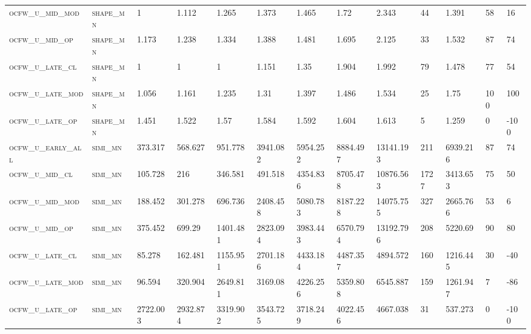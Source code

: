\begin{landscape}
\begin{center}
\begin{footnotesize}
\begin{longtable}{lllllllllllll}
\textsc{ocfw\_u\_mid\_mod  } & \textsc{shape\_mn }   & 1        & 1.112    & 1.265    & 1.373    & 1.465    & 1.72     & 2.343     & 44     & 1.391         & 58            & 16       \\
\textsc{ocfw\_u\_mid\_op   } & \textsc{shape\_mn }   & 1.173    & 1.238    & 1.334    & 1.388    & 1.481    & 1.695    & 2.125     & 33     & 1.532         & 87            & 74       \\
\textsc{ocfw\_u\_late\_cl  } & \textsc{shape\_mn }   & 1        & 1        & 1        & 1.151    & 1.35     & 1.904    & 1.992     & 79     & 1.478         & 77            & 54       \\
\textsc{ocfw\_u\_late\_mod } & \textsc{shape\_mn }   & 1.056    & 1.161    & 1.235    & 1.31     & 1.397    & 1.486    & 1.534     & 25     & 1.75          & 100           & 100      \\
\textsc{ocfw\_u\_late\_op  } & \textsc{shape\_mn }   & 1.451    & 1.522    & 1.57     & 1.584    & 1.592    & 1.604    & 1.613     & 5      & 1.259         & 0             & -100     \\
\textsc{ocfw\_u\_early\_all} & \textsc{simi\_mn  }   & 373.317  & 568.627  & 951.778  & 3941.082 & 5954.252 & 8884.497 & 13141.193 & 211    & 6939.216      & 87            & 74       \\
\textsc{ocfw\_u\_mid\_cl   } & \textsc{simi\_mn  }   & 105.728  & 216      & 346.581  & 491.518  & 4354.836 & 8705.478 & 10876.563 & 1727   & 3413.653      & 75            & 50       \\
\textsc{ocfw\_u\_mid\_mod  } & \textsc{simi\_mn  }   & 188.452  & 301.278  & 696.736  & 2408.458 & 5080.783 & 8187.228 & 14075.755 & 327    & 2665.766      & 53            & 6        \\
\textsc{ocfw\_u\_mid\_op   } & \textsc{simi\_mn  }   & 375.452  & 699.29   & 1401.481 & 2823.094 & 3983.443 & 6570.794 & 13192.796 & 208    & 5220.69       & 90            & 80       \\
\textsc{ocfw\_u\_late\_cl  } & \textsc{simi\_mn  }   & 85.278   & 162.481  & 1155.951 & 2701.186 & 4433.184 & 4487.357 & 4894.572  & 160    & 1216.445      & 30            & -40      \\
\textsc{ocfw\_u\_late\_mod } & \textsc{simi\_mn  }   & 96.594   & 320.904  & 2649.811 & 3169.08  & 4226.256 & 5359.808 & 6545.887  & 159    & 1261.947      & 7             & -86      \\
\textsc{ocfw\_u\_late\_op  } & \textsc{simi\_mn  }   & 2722.003 & 2932.874 & 3319.902 & 3543.725 & 3718.249 & 4022.456 & 4667.038  & 31     & 537.273       & 0             & -100    

\end{longtable}
\end{footnotesize}
\end{center}
\end{landscape}

